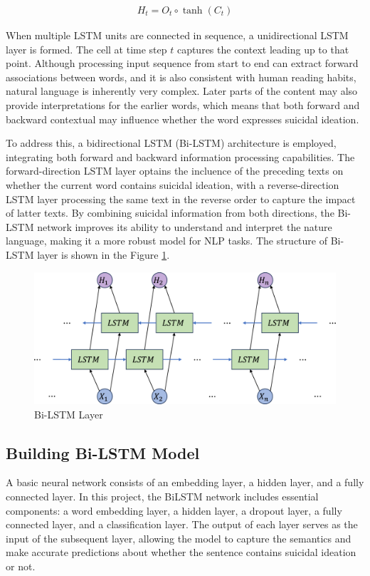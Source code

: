 \documentclass[ %
                    author={Bocheng Wang},
                supervisor={Dr. Qiang Liu},
                    degree={MSc},
                     title={A Research on Identification of Suicide Ideation in Texts with Multiple Models},
                      type={},
                      year={2024}]{dissertation}
\begin{document}
\begin{eqnarray}
      H_t = O_t \circ \tanh(C_t)
      \label{ht}
\end{eqnarray}

When multiple LSTM units are connected in sequence, a unidirectional LSTM layer is formed. The cell at time step $t$ captures the context leading up to that point. Although processing input sequence from start to end can extract forward associations between words, and it is also consistent with human reading habits, natural language is inherently very complex. Later parts of the content may also provide interpretations for the earlier words, which means that both forward and backward contextual may influence whether the word expresses suicidal ideation. 

To address this, a bidirectional LSTM (Bi-LSTM) architecture is employed, integrating both forward and backward information processing capabilities. The forward-direction LSTM layer optains the incluence of the preceding texts on whether the current word contains suicidal ideation, with a reverse-direction LSTM layer processing the same text in the reverse order to capture the impact of latter texts. By combining suicidal information from both directions, the Bi-LSTM network improves its ability to understand and interpret the nature language, making it a more robust model for NLP tasks. The structure of Bi-LSTM layer is shown in the Figure \ref{fig:bilstm}.

\begin{figure}[h]
      \centering
      \includegraphics[width=0.7\linewidth]{../img/bilstm.eps}
      \caption{Bi-LSTM Layer}
      \label{fig:bilstm}
\end{figure}

\subsection{Building Bi-LSTM Model}
\noindent
A basic neural network consists of an embedding layer, a hidden layer, and a fully connected layer. In this project, the BiLSTM network includes essential components: a word embedding layer, a hidden layer, a dropout layer, a fully connected layer, and a classification layer. The output of each layer serves as the input of the subsequent layer, allowing the model to capture the semantics and make accurate predictions about whether the sentence contains suicidal ideation or not.
\end{document}
